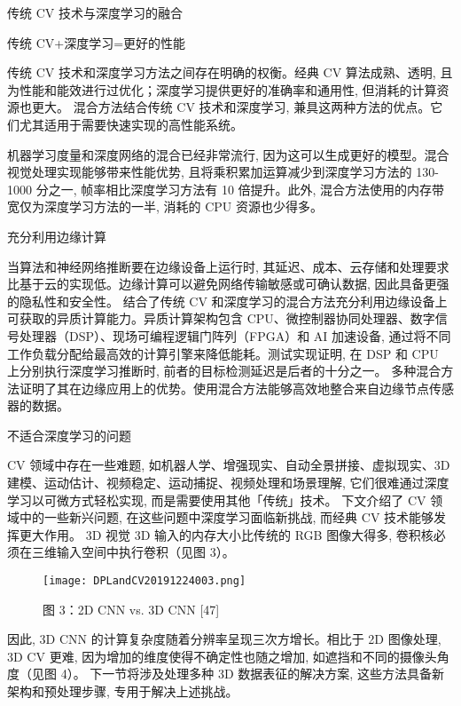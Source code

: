 传统 CV 技术与深度学习的融合

传统 CV+深度学习=更好的性能

传统 CV 技术和深度学习方法之间存在明确的权衡。经典 CV 算法成熟、透明, 且为性能和能效进行过优化；深度学习提供更好的准确率和通用性, 但消耗的计算资源也更大。
混合方法结合传统 CV 技术和深度学习, 兼具这两种方法的优点。它们尤其适用于需要快速实现的高性能系统。

机器学习度量和深度网络的混合已经非常流行, 因为这可以生成更好的模型。混合视觉处理实现能够带来性能优势, 且将乘积累加运算减少到深度学习方法的 130-1000 分之一, 帧率相比深度学习方法有 10 倍提升。此外, 混合方法使用的内存带宽仅为深度学习方法的一半, 消耗的 CPU 资源也少得多。

充分利用边缘计算

当算法和神经网络推断要在边缘设备上运行时, 其延迟、成本、云存储和处理要求比基于云的实现低。边缘计算可以避免网络传输敏感或可确认数据, 因此具备更强的隐私性和安全性。
结合了传统 CV 和深度学习的混合方法充分利用边缘设备上可获取的异质计算能力。异质计算架构包含 CPU、微控制器协同处理器、数字信号处理器（DSP）、现场可编程逻辑门阵列（FPGA）和 AI 加速设备, 通过将不同工作负载分配给最高效的计算引擎来降低能耗。测试实现证明, 在 DSP 和 CPU 上分别执行深度学习推断时, 前者的目标检测延迟是后者的十分之一。
多种混合方法证明了其在边缘应用上的优势。使用混合方法能够高效地整合来自边缘节点传感器的数据。

不适合深度学习的问题

CV 领域中存在一些难题, 如机器人学、增强现实、自动全景拼接、虚拟现实、3D 建模、运动估计、视频稳定、运动捕捉、视频处理和场景理解, 它们很难通过深度学习以可微方式轻松实现, 而是需要使用其他「传统」技术。
下文介绍了 CV 领域中的一些新兴问题, 在这些问题中深度学习面临新挑战, 而经典 CV 技术能够发挥更大作用。
3D 视觉
3D 输入的内存大小比传统的 RGB 图像大得多, 卷积核必须在三维输入空间中执行卷积（见图 3）。
\begin{figure}[H]
\centering
\texttt{[image: DPLandCV20191224003.png]}
\caption{图 3：2D CNN vs. 3D CNN [47]}
\label{DPLandCV20191224003}
\end{figure}


因此, 3D CNN 的计算复杂度随着分辨率呈现三次方增长。相比于 2D 图像处理, 3D CV 更难, 因为增加的维度使得不确定性也随之增加, 如遮挡和不同的摄像头角度（见图 4）。
下一节将涉及处理多种 3D 数据表征的解决方案, 这些方法具备新架构和预处理步骤, 专用于解决上述挑战。
